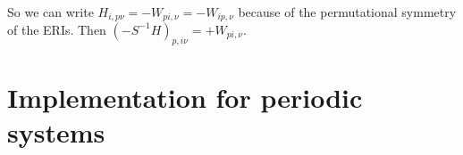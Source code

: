 \begin{align}
\end{align}
So we can write ${H_{i,p \nu} = -W_{pi,\nu}=-W_{ip,\nu}}$ because of the permutational symmetry of the ERIs. Then $\boxed{(-{S^{-1}H})_{p,i \nu} =+ W_{pi,\nu}}$.
\section{Implementation for periodic systems}
